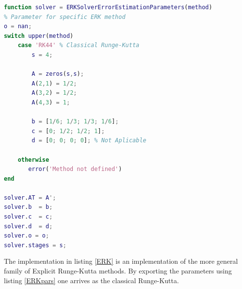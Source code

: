 \begin{adjustwidth*}{0cm}{-0.4cm}
\begin{lstlisting}[frame=single, language=Matlab,caption=Classical Runge-Kutta Parameters, label=ERKpars]
function solver = ERKSolverErrorEstimationParameters(method)
% Parameter for specific ERK method
o = nan;
switch upper(method)
    case 'RK44' % Classical Runge-Kutta
        s = 4;

        A = zeros(s,s);
        A(2,1) = 1/2;
        A(3,2) = 1/2;
        A(4,3) = 1;

        b = [1/6; 1/3; 1/3; 1/6];
        c = [0; 1/2; 1/2; 1];
        d = [0; 0; 0; 0]; % Not Aplicable

    otherwise
       error('Method not defined') 
end

solver.AT = A';
solver.b  = b;
solver.c  = c;
solver.d  = d;
solver.o = o;
solver.stages = s;
\end{lstlisting}
\end{adjustwidth*}

The implementation in listing \ref{ERK} is an implementation of the more general family of Explicit Runge-Kutta methods. By exporting the parameters using listing \ref{ERKpars} one arrives as the classical Runge-Kutta.

